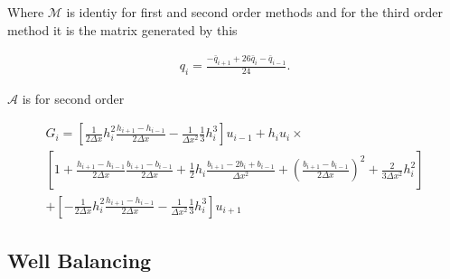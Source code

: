 \documentclass[12pt]{article}
\begin{document}
Where $\mathcal{M}$ is identiy for first and second order methods and for the third order method it is the matrix generated by this


\begin{gather}\label{eq:midtoca}
q_i = \frac{- \bar{q}_{i+1} + 26\bar{q}_{i} - \bar{q}_{i-1}}{24}.
\end{gather}

$\mathcal{A}$ is for second order

\begin{multline}
\label{chp3FDHtou}
G_i =  \left[ \frac{1}{2\Delta x}h_i^2 \frac{h_{i+1} - h_{i-1}}{2\Delta x}  -  \frac{1}{\Delta x^2} \frac{1}{3}h_i^3 \right]u_{i-1} + h_iu_i \times \\ \left[ 1 + \frac{h_{i+1} - h_{i-1}}{2\Delta x} \frac{b_{i+1} - b_{i-1}}{2\Delta x} + \frac{1}{2}h_i\frac{b_{i+1} -2b_i + b_{i-1}}{\Delta x^2} + \left(\frac{b_{i+1} - b_{i-1}}{2\Delta x}\right)^2 + \frac{2}{ 3 \Delta x^2} h_i^2 \right] \\ + \left[ -\frac{1}{2\Delta x}h_i^2 \frac{h_{i+1} - h_{i-1}}{2\Delta x}  -  \frac{1}{\Delta x^2} \frac{1}{3}h_i^3 \right]u_{i+1}
\end{multline}

\subsection{Well Balancing}
\end{document}
